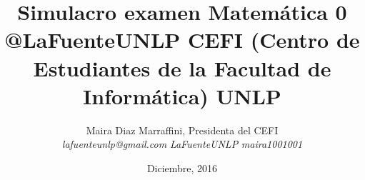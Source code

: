 \title{\Huge \textbf{Simulacro examen Matemática 0} \\
 @LaFuenteUNLP CEFI (Centro de Estudiantes de la Facultad de Informática) UNLP}

\author{Maira Diaz Marraffini, Presidenta del CEFI\\
\emph{lafuenteunlp@gmail.com} 
\emph{\faFacebook LaFuenteUNLP} 
\emph{\faGithub maira1001001} }

\date{Diciembre, 2016}
